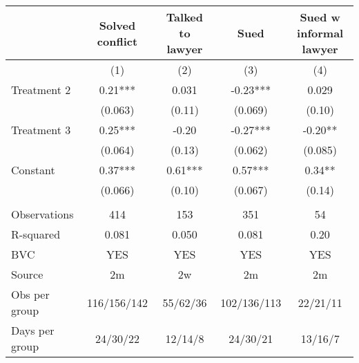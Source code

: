\begin{tabular}{lcccc}
\toprule
      & Solved conflict & Talked to lawyer & Sued  & Sued w informal lawyer \\
\midrule
\midrule
      & (1)   & (2)   & (3)   & (4) \\
\midrule
\midrule
Treatment 2 & 0.21*** & 0.031 & -0.23*** & 0.029 \\
      & (0.063) & (0.11) & (0.069) & (0.10) \\
Treatment 3 & 0.25*** & -0.20 & -0.27*** & -0.20** \\
      & (0.064) & (0.13) & (0.062) & (0.085) \\
Constant  & 0.37*** & 0.61*** & 0.57*** & 0.34** \\
      & (0.066) & (0.10) & (0.067) & (0.14) \\
      &       &       &       &  \\
\midrule
Observations & 414   & 153   & 351   & 54 \\
R-squared & 0.081 & 0.050 & 0.081 & 0.20 \\
BVC   & YES   & YES   & YES   & YES \\
Source & 2m    & 2w    & 2m    & 2m \\
Obs per group & 116/156/142 & 55/62/36 & 102/136/113 & 22/21/11 \\
Days per group & 24/30/22 & 12/14/8 & 24/30/21 & 13/16/7 \\
\bottomrule
\bottomrule
\end{tabular}%
